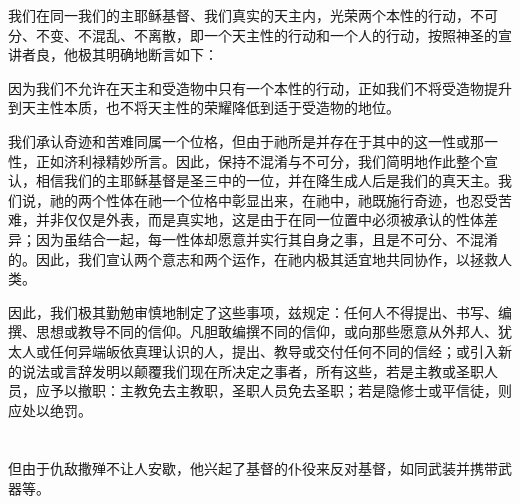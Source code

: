我们在同一我们的主耶稣基督、我们真实的天主内，光荣两个本性的行动，不可分、不变、不混乱、不离散，即一个天主性的行动和一个人的行动，按照神圣的宣讲者良，他极其明确地断言如下：\par

因为我们不允许在天主和受造物中只有一个本性的行动，正如我们不将受造物提升到天主性本质，也不将天主性的荣耀降低到适于受造物的地位。\par

我们承认奇迹和苦难同属一个位格，但由于祂所是并存在于其中的这一性或那一性，正如济利禄精妙所言。因此，保持不混淆与不可分，我们简明地作此整个宣认，相信我们的主耶稣基督是圣三中的一位，并在降生成人后是我们的真天主。我们说，祂的两个性体在祂一个位格中彰显出来，在祂中，祂既施行奇迹，也忍受苦难，并非仅仅是外表，而是真实地，这是由于在同一位置中必须被承认的性体差异；因为虽结合一起，每一性体却愿意并实行其自身之事，且是不可分、不混淆的。因此，我们宣认两个意志和两个运作，在祂内极其适宜地共同协作，以拯救人类。\par

因此，我们极其勤勉审慎地制定了这些事项，兹规定：任何人不得提出、书写、编撰、思想或教导不同的信仰。凡胆敢编撰不同的信仰，或向那些愿意从外邦人、犹太人或任何异端皈依真理认识的人，提出、教导或交付任何不同的信经；或引入新的说法或言辞发明以颠覆我们现在所决定之事者，所有这些，若是主教或圣职人员，应予以撤职：主教免去主教职，圣职人员免去圣职；若是隐修士或平信徒，则应处以绝罚。\par


\section{}

\par

但由于仇敌撒殚不让人安歇，他兴起了基督的仆役来反对基督，如同武装并携带武器等。\par

\par

